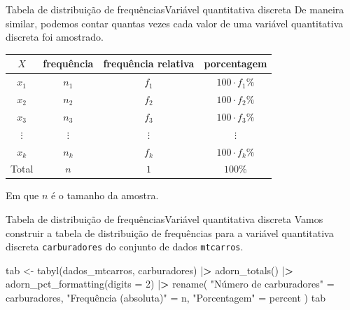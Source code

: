 \documentclass[
  10pt,
  ignorenonframetext,
]{beamer}
\newenvironment{Shaded}{}{}
\newcommand{\DataTypeTok}[1]{#1}
\newcommand{\DecValTok}[1]{#1}
\newcommand{\ErrorTok}[1]{\textcolor[rgb]{1.00,0.00,0.00}{\textbf{#1}}}
\newcommand{\KeywordTok}[1]{\textcolor[rgb]{0.00,0.00,1.00}{#1}}
\newcommand{\NormalTok}[1]{#1}
\newcommand{\OperatorTok}[1]{#1}
\newcommand{\StringTok}[1]{\textcolor[rgb]{0.00,0.50,0.50}{#1}}
\begin{document}
\begin{frame}{Tabela de distribuição de frequências\newline Variável
quantitativa discreta}
\protect\hypertarget{tabela-de-distribuiuxe7uxe3o-de-frequuxeanciasvariuxe1vel-quantitativa-discreta-2}{}
De maneira similar, podemos contar quantas vezes cada valor de uma
variável quantitativa discreta foi amostrado.

\begin{longtable}[]{@{}cccc@{}}
\toprule
\(X\) & frequência & frequência relativa & porcentagem\tabularnewline
\midrule
\endhead
\(x_1\) & \(n_1\) & \(f_1\) & \(100\cdot f_1 \%\)\tabularnewline
\(x_2\) & \(n_2\) & \(f_2\) & \(100\cdot f_2 \%\)\tabularnewline
\(x_3\) & \(n_3\) & \(f_3\) & \(100\cdot f_3 \%\)\tabularnewline
\(\vdots\) & \(\vdots\) & \(\vdots\) & \(\vdots\)\tabularnewline
\(x_k\) & \(n_k\) & \(f_k\) & \(100\cdot f_k \%\)\tabularnewline
Total & \(n\) & \(1\) & \(100 \%\)\tabularnewline
\bottomrule
\end{longtable}

Em que \(n\) é o tamanho da amostra.
\end{frame}

\begin{frame}[fragile]{Tabela de distribuição de
frequências\newline Variável quantitativa discreta}
\protect\hypertarget{tabela-de-distribuiuxe7uxe3o-de-frequuxeanciasvariuxe1vel-quantitativa-discreta-3}{}
Vamos construir a tabela de distribuição de frequências para a variável
quantitativa discreta \texttt{carburadores} do conjunto de dados
\texttt{mtcarros}.

\begin{Shaded}
\begin{Highlighting}[]
\NormalTok{tab \textless{}{-}}\StringTok{ }\KeywordTok{tabyl}\NormalTok{(dados\_mtcarros, carburadores) }\OperatorTok{|}\ErrorTok{\textgreater{}}
\StringTok{  }\KeywordTok{adorn\_totals}\NormalTok{() }\OperatorTok{|}\ErrorTok{\textgreater{}}
\StringTok{  }\KeywordTok{adorn\_pct\_formatting}\NormalTok{(}\DataTypeTok{digits =} \DecValTok{2}\NormalTok{) }\OperatorTok{|}\ErrorTok{\textgreater{}}
\StringTok{  }\KeywordTok{rename}\NormalTok{(}
    \StringTok{"Número de carburadores"}\NormalTok{ =}\StringTok{ }\NormalTok{carburadores,}
    \StringTok{"Frequência (absoluta)"}\NormalTok{ =}\StringTok{ }\NormalTok{n,}
    \StringTok{"Porcentagem"}\NormalTok{ =}\StringTok{ }\NormalTok{percent}
\NormalTok{  )}
\NormalTok{tab}
\end{Highlighting}
\end{Shaded}
\end{frame}
\end{document}
